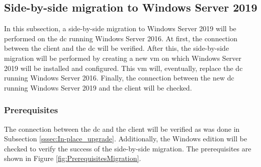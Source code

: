 \subsection{Side-by-side migration to Windows Server 2019}
In this subsection, a side-by-side migration to Windows Server 2019 will be performed on the \acrshort{dc} running Windows Server 2016. 
At first, the connection between the client and the \acrshort{dc} will be verified. 
After this, the side-by-side migration will be performed by creating a new \acrshort{vm} on which Windows Server 2019 will be installed and configured. 
This \acrshort{vm} will, eventually, replace the \acrshort{dc} running Windows Server 2016. 
Finally, the connection between the new  \acrshort{dc} running Windows Server 2019 and the client will be checked.

\subsubsection{Prerequisites}
The connection between the \acrshort{dc} and the client will be verified as was done in Subsection \ref{sssec:In-place_upgrade}.
Additionally, the Windows edition will be checked to verify the success of the side-by-side migration. 
The prerequisites are shown in Figure \ref{fig:PrerequisitesMigration}.

